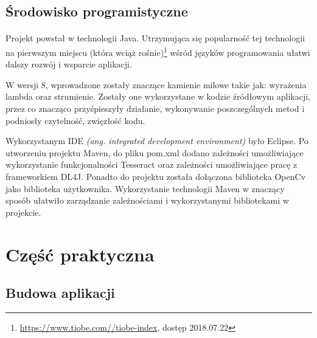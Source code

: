 \documentclass[a4paper,12pt]{article}
\begin{document}
	\subsection{Środowisko programistyczne}
		\paragraph{\indent} Projekt powstał w technologii Java. Utrzymująca się popularność tej technologii na pierwszym miejscu 
			(która wciąż rośnie)\footnote{\href{https://www.tiobe.com//tiobe-index}{\url{https://www.tiobe.com//tiobe-index}}, dostęp 2018.07.22} 
			wśród języków programowania ułatwi dalszy rozwój i wsparcie aplikacji. 
		
		\par W wersji 8, wprowadzone zostały znaczące kamienie milowe takie jak: wyrażenia lambda oraz strumienie. Zostały one wykorzystane 
			w kodzie źródłowym aplikacji, przez co znacząco przyśpieszyły działanie, wykonywanie poszczególnych metod i podniosły czytelność, zwięzłość kodu. 
        
		\par Wykorzystanym IDE \textit{(ang. integrated development environment)} było Eclipse. Po utworzeniu projektu Maven, do pliku pom.xml 
			dodano zależności umożliwiające wykorzystanie funkcjonalności Tesseract oraz zależności umożliwiające pracę z frameworkiem DL4J. 
			Ponadto do projektu została dołączona biblioteka OpenCv jako biblioteka użytkownika. Wykorzystanie technologii Maven 
			w znaczący sposób ułatwiło zarządzanie zależnościami i wykorzystanymi bibliotekami w projekcie.
        \newpage
        
\section{Część praktyczna}
	\subsection{Budowa aplikacji}
\end{document}
